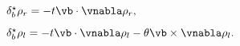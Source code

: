 \begin{equation}
     \begin{array}{ll}
\delta^{\star}_{b}\rho_{r}=-t\vb\cdot\vnabla\rho_{r},
\\[8pt]
\delta^{\star}_{b}\rho_{l}=
-t\vb\cdot\vnabla\rho_{l}
-\theta\vb\times\vnabla\rho_{l}.
\end{array}
\label{denschange}
\end{equation}


